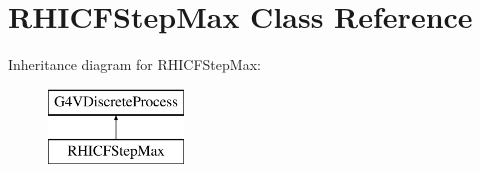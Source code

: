 \hypertarget{class_r_h_i_c_f_step_max}{}\section{R\+H\+I\+C\+F\+Step\+Max Class Reference}
\label{class_r_h_i_c_f_step_max}
Inheritance diagram for R\+H\+I\+C\+F\+Step\+Max\+:\begin{figure}[H]
\begin{center}
\leavevmode
\includegraphics[height=2.000000cm]{class_r_h_i_c_f_step_max}
\end{center}
\end{figure}
